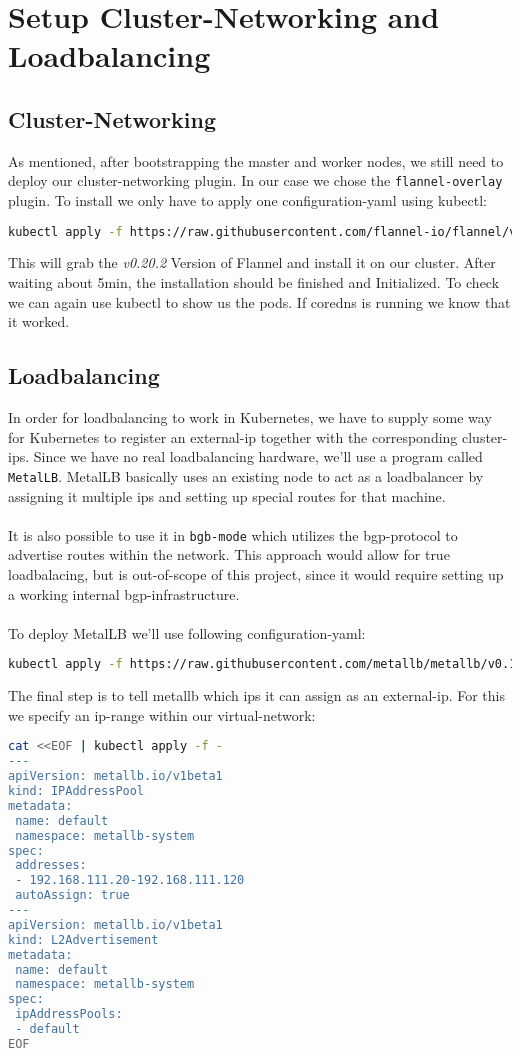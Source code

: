 \section{Setup Cluster-Networking and Loadbalancing}
\subsection{Cluster-Networking}
As mentioned, after bootstrapping the master and worker nodes, we still need to deploy our cluster-networking plugin. In our case we chose the \texttt{flannel-overlay} plugin.
To install we only have to apply one configuration-yaml using kubectl:
\begin{lstlisting}[language=bash,caption=Deploy Flannel-Networking] 
kubectl apply -f https://raw.githubusercontent.com/flannel-io/flannel/v0.20.2/Documentation/kube-flannel.yml
\end{lstlisting}
This will grab the \textit{v0.20.2} Version of Flannel and install it on our cluster.
After waiting about 5min, the installation should be finished and Initialized. To check we can again use kubectl to show us the pods. If coredns is running we know that it worked.
\subsection{Loadbalancing}
In order for loadbalancing to work in Kubernetes, we have to supply some way for Kubernetes to register an external-ip together with the corresponding cluster-ips. Since we have no real loadbalancing hardware, we'll use a program called \texttt{MetalLB}.
MetalLB basically uses an existing node to act as a loadbalancer by assigning it multiple ips and setting up special routes for that machine.\\\\It is also possible to use it in \texttt{bgb-mode} which utilizes the bgp-protocol to advertise routes within the network. This approach would allow for true loadbalacing, but is out-of-scope of this project, since it would require setting up a working internal bgp-infrastructure.\\\\To deploy MetalLB we'll use following configuration-yaml:
\begin{lstlisting}[language=bash,caption=Deploy MetalLB Loadbalacing] 
kubectl apply -f https://raw.githubusercontent.com/metallb/metallb/v0.13.7/config/manifests/metallb-native.yaml
\end{lstlisting}
\noindent The final step is to tell metallb which ips it can assign as an external-ip. For this we specify an ip-range within our virtual-network:
\begin{lstlisting}[language=bash,caption=Set assinable IP-Ranges for external IPs] 
cat <<EOF | kubectl apply -f -
---
apiVersion: metallb.io/v1beta1
kind: IPAddressPool
metadata:
 name: default
 namespace: metallb-system
spec:
 addresses:
 - 192.168.111.20-192.168.111.120
 autoAssign: true
---
apiVersion: metallb.io/v1beta1
kind: L2Advertisement
metadata:
 name: default
 namespace: metallb-system
spec:
 ipAddressPools:
 - default
EOF
\end{lstlisting}
\clearpage
